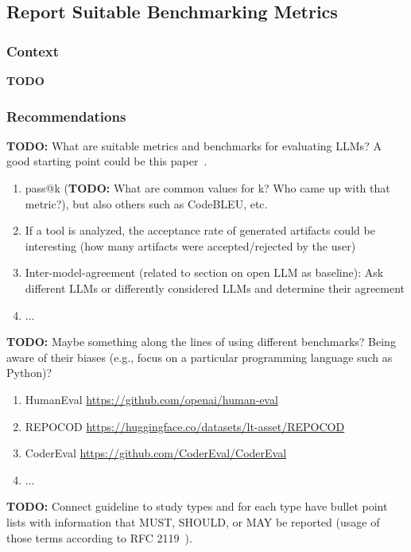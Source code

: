 \documentclass[11pt]{article}
\begin{document}
\subsection{Report Suitable Benchmarking Metrics}

\subsubsection{Context}

\textbf{TODO}

\subsubsection{Recommendations}

\textbf{TODO:} What are suitable metrics and benchmarks for evaluating LLMs? A good starting point could be this paper~\cite{10.1145/3695988}.

\begin{enumerate}
\item pass@k (\textbf{TODO:} What are common values for k? Who came up with that metric?), but also others such as CodeBLEU, etc.
\item If a tool is analyzed, the acceptance rate of generated artifacts could be interesting (how many artifacts were accepted/rejected by the user)
\item Inter-model-agreement (related to section on open LLM as baseline): Ask different LLMs or differently considered LLMs and determine their agreement 
\item ...
\end{enumerate}

\textbf{TODO:} Maybe something along the lines of using different benchmarks? Being aware of their biases (e.g., focus on a particular programming language such as Python)?

\begin{enumerate}
\item HumanEval \url{https://github.com/openai/human-eval}
\item REPOCOD \url{https://huggingface.co/datasets/lt-asset/REPOCOD}
\item CoderEval \url{https://github.com/CoderEval/CoderEval}
\item ...
\end{enumerate}

\textbf{TODO:} Connect guideline to study types and for each type have bullet point lists with information that MUST, SHOULD, or MAY be reported (usage of those terms according to RFC 2119~\cite{rfc2119}).
\end{document}

